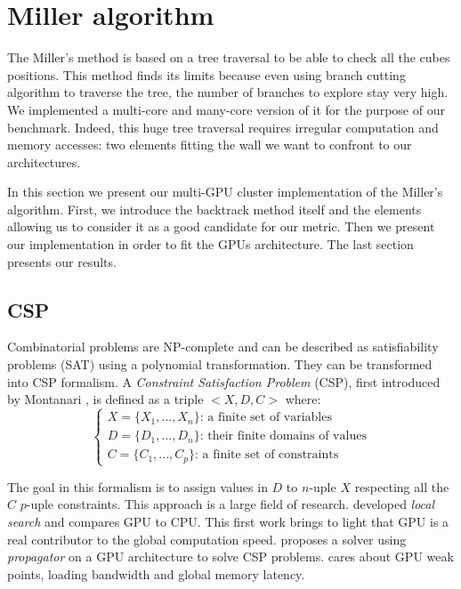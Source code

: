 \section{Miller algorithm}

The Miller's method is based on a tree traversal to be able to check all the cubes positions.
This method finds its limits because even using branch cutting algorithm to traverse the tree, the number of branches to explore stay very high. 
We implemented a multi-core and many-core version of it for the purpose of our benchmark. 
Indeed, this huge tree traversal requires irregular computation and memory accesses: two elements fitting the wall we want to confront to our architectures. 

In this section we present our multi-GPU cluster implementation of the Miller's algorithm. 
First, we introduce the backtrack method itself and the elements allowing us to consider it as a good candidate for our metric. 
Then we present our implementation in order to fit the GPUs architecture. 
The last section presents our results. 

\subsection{CSP}

Combinatorial problems are NP-complete \cite{GJ79} and can be described as satisfiability problems (SAT) using a polynomial transformation. 
They can be transformed into CSP formalism.
A \textit{Constraint Satisfaction Problem} (CSP), first introduced by Montanari \cite{Mon74}, is defined as a triple $<X,D,C>$ where:
\begin{equation}
\begin{cases}
X=\{X_1,...,X_n\}\text{: a finite set of variables} \\ 
D=\{D_1,...,D_n\}\text{: their finite domains of values}\\
C=\{C_1,...,C_p\}\text{: a finite set of constraints}
\end{cases}
\end{equation}

The goal in this formalism is to assign values in $D$ to $n$-uple $X$ respecting all the $C$ $p$-uple constraints.
This approach is a large field of research. \cite{arbelaez2014gpu} developed \textit{local search} and compares GPU to CPU. 
This first work brings to light that GPU is a real contributor to the global computation speed. \cite{campeotto2014exploring} proposes a solver using \textit{propagator} on a GPU architecture to solve CSP problems. 
\cite{jenkins2011lessons} cares about GPU weak points, loading bandwidth and global memory latency.

